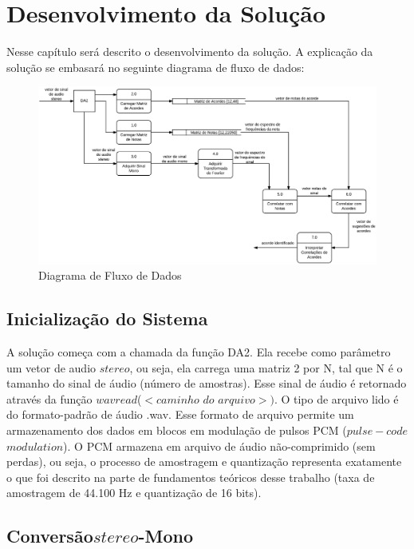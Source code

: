 \chapter{Desenvolvimento da Solução}
\label{chap:solucaocompleta}

Nesse capítulo será descrito o desenvolvimento da solução. A explicação da solução se embasará no seguinte diagrama de fluxo de dados:

\begin{figure}[h]
	\centering
		\includegraphics[keepaspectratio=true,scale=0.315]{figuras/dfd.eps}
	\caption{Diagrama de Fluxo de Dados}
\end{figure}

\section{Inicialização do Sistema}
\label{sec:inicializacao}

A solução começa com a chamada da função DA2. Ela recebe como parâmetro um vetor de audio $stereo$, ou seja, ela carrega uma matriz 2 por N, tal que N é o tamanho do sinal de áudio (número de amostras). Esse sinal de áudio é retornado através da função $wavread$($<$$caminho$ $do$ $arquivo$$>$$)$. O tipo de arquivo lido é do formato-padrão de áudio .wav. Esse formato de arquivo permite um armazenamento dos dados em blocos em modulação de pulsos PCM ($pulse-code$ $modulation$). O PCM armazena em arquivo de áudio não-comprimido (sem perdas), ou seja, o processo de amostragem e quantização representa exatamente o que foi descrito na parte de fundamentos teóricos desse trabalho (taxa de amostragem de 44.100 Hz e quantização de 16 bits).

\section{Conversão$stereo$-Mono}
\label{sec:conversao}

